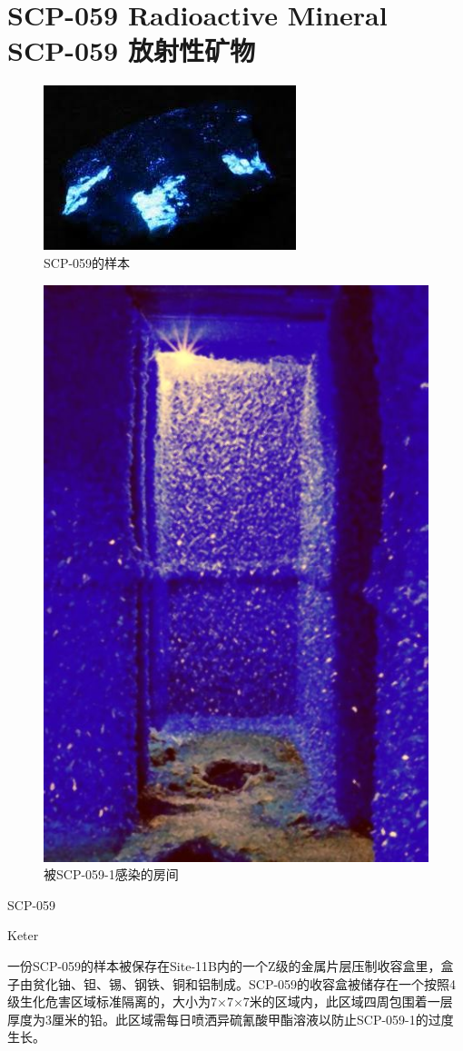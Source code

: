 \chapter[SCP-059 放射性矿物]{
    SCP-059 Radioactive Mineral\\
    SCP-059 放射性矿物
}

\label{chap:SCP-059}

\begin{figure}[H]
    \centering
    \includegraphics[width=0.5\linewidth]{images/SCP.059.jpg}
    \caption*{SCP-059的样本}
\end{figure}

\begin{figure}[H]
    \centering
    \includegraphics[width=0.5\linewidth]{images/SCP.059.2.jpg}
    \caption*{被SCP-059-1感染的房间}
\end{figure}

SCP-059

Keter

一份SCP-059的样本被保存在Site-11B内的一个Z级的金属片层压制收容盒里，盒子由贫化铀、钽、锡、钢铁、铜和铝制成。SCP-059的收容盒被储存在一个按照4级生化危害区域标准隔离的，大小为7×7×7米的区域内，此区域四周包围着一层厚度为3厘米的铅。此区域需每日喷洒异硫氰酸甲酯溶液以防止SCP-059-1的过度生长。

